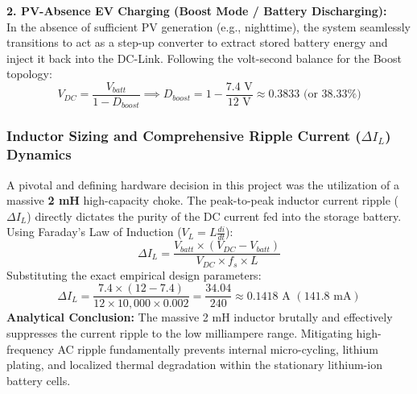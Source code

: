 \textbf{2. PV-Absence EV Charging (Boost Mode / Battery Discharging):}\\
In the absence of sufficient PV generation (e.g., nighttime), the system seamlessly transitions to act as a step-up converter to extract stored battery energy and inject it back into the DC-Link. Following the volt-second balance for the Boost topology:
\begin{equation}
    V_{DC} = \frac{V_{batt}}{1 - D_{boost}} \implies D_{boost} = 1 - \frac{7.4\text{ V}}{12\text{ V}} \approx 0.3833 \text{ (or } 38.33\% \text{)}
    \label{eq:d_boost}
\end{equation}

\subsubsection{Inductor Sizing and Comprehensive Ripple Current ($\Delta I_L$) Dynamics}
A pivotal and defining hardware decision in this project was the utilization of a massive \textbf{2 mH} high-capacity choke. The peak-to-peak inductor current ripple ($\Delta I_L$) directly dictates the purity of the DC current fed into the storage battery. Using Faraday's Law of Induction ($V_L = L \frac{di}{dt}$):
\begin{equation}
    \Delta I_L = \frac{V_{batt} \times (V_{DC} - V_{batt})}{V_{DC} \times f_s \times L}
    \label{eq:ripple_formula}
\end{equation}
Substituting the exact empirical design parameters:
\begin{equation}
    \Delta I_L = \frac{7.4 \times (12 - 7.4)}{12 \times 10,000 \times 0.002} = \frac{34.04}{240} \approx 0.1418 \text{ A } (141.8 \text{ mA})
    \label{eq:ripple_result}
\end{equation}
\textbf{Analytical Conclusion:} The massive 2 mH inductor brutally and effectively suppresses the current ripple to the low milliampere range. Mitigating high-frequency AC ripple fundamentally prevents internal micro-cycling, lithium plating, and localized thermal degradation within the stationary lithium-ion battery cells.

